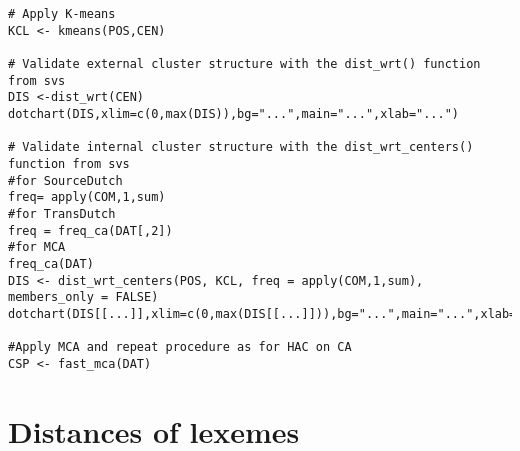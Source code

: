 \begin{lstlisting}[style=RStyle]
# Apply K-means
KCL <- kmeans(POS,CEN)

# Validate external cluster structure with the dist_wrt() function from svs
DIS <-dist_wrt(CEN)
dotchart(DIS,xlim=c(0,max(DIS)),bg="...",main="...",xlab="...")

# Validate internal cluster structure with the dist_wrt_centers() function from svs
#for SourceDutch
freq= apply(COM,1,sum)
#for TransDutch
freq = freq_ca(DAT[,2])
#for MCA
freq_ca(DAT)
DIS <- dist_wrt_centers(POS, KCL, freq = apply(COM,1,sum), members_only = FALSE)
dotchart(DIS[[...]],xlim=c(0,max(DIS[[...]])),bg="...",main="...",xlab="...")

#Apply MCA and repeat procedure as for HAC on CA
CSP <- fast_mca(DAT)
\end{lstlisting}

\chapter{Distances of lexemes}\label{ch:C}
